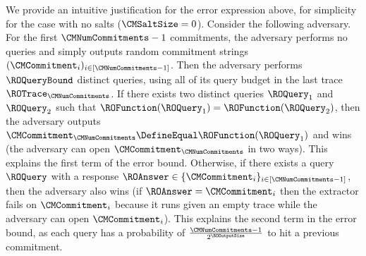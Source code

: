 We provide an intuitive justification for the error expression above, for simplicity for the case with no salts ($\CMSaltSize = 0$). Consider the following adversary. For the first $\CMNumCommitments-1$ commitments, the adversary performs no queries and simply outputs random commitment strings $(\CMCommitment_{i})_{i \in [\CMNumCommitments-1]}$. Then the adversary performs $\ROQueryBound$ distinct queries, using all of its query budget in the last trace $\ROTrace_{\CMNumCommitments}$. If there exists two distinct queries $\ROQuery_{1}$ and $\ROQuery_{2}$ such that $\ROFunction(\ROQuery_{1}) = \ROFunction(\ROQuery_{2})$, then the adversary outputs $\CMCommitment_{\CMNumCommitments} \DefineEqual \ROFunction(\ROQuery_{1})$ and wins (the adversary can open $\CMCommitment_{\CMNumCommitments}$ in two ways). This explains the first term of the error bound. Otherwise, if there exists a query $\ROQuery$ with a response $\ROAnswer \in \{\CMCommitment_{i}\}_{i \in [\CMNumCommitments-1]}$, then the adversary also wins (if $\ROAnswer = \CMCommitment_{i}$ then the extractor fails on $\CMCommitment_{i}$ because it runs given an empty trace while the adversary can open $\CMCommitment_{i}$). This explains the second term in the error bound, as each query has a probability of $\frac{\CMNumCommitments-1}{2^{\ROOutputSize}}$ to hit a previous commitment.

